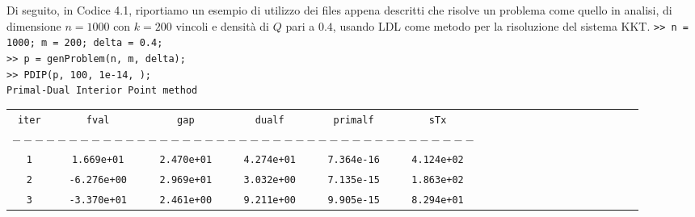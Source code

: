 Di seguito, in Codice 4.1, riportiamo un esempio di utilizzo dei files appena descritti che risolve un problema come quello in analisi, di dimensione $n=1000$ con $k=200$ vincoli e densità di $Q$ pari a $0.4$, usando LDL come metodo per la risoluzione del sistema KKT.
\newpage
\noindent
\texttt{>> n = 1000; m = 200; delta = 0.4;}\\
\texttt{>> p = genProblem(n, m, delta);}\\
\texttt{>> PDIP(p, 100, 1e-14, );}\\
\noindent
\texttt{Primal-Dual Interior Point method}
\begin{table}[!h]
\begin{tabular}{ccccccllllllllllllll}
\texttt{iter}                                              & \texttt{fval}                                                                  & \texttt{gap}                                                                   & \texttt{dualf}                                                                 & \texttt{primalf}              & \texttt{sTx}                  &  &  &  &  &  &  &  &  &  &  &  &  &  &  \\
\multicolumn{6}{l}{$-----------------------------------------$}                                                                                                                                                                                                                                                                                                         &  &  &  &  &  &  &  &  &  &  &  &  &  &  \\
\texttt{1}                                                 & \texttt{1.669e+01}                                                             & \texttt{2.470e+01}                                                             & \texttt{4.274e+01}                                                             & \texttt{7.364e-16}            & \texttt{4.124e+02}            &  &  &  &  &  &  &  &  &  &  &  &  &  &  \\
\texttt{2}                                                 & \texttt{-6.276e+00}                                                            & \texttt{2.969e+01}                                                             & \texttt{3.032e+00}                                                             & \texttt{7.135e-15}            & \texttt{1.863e+02}            &  &  &  &  &  &  &  &  &  &  &  &  &  &  \\
\texttt{3}                                                 & \texttt{-3.370e+01}                                                            & \texttt{2.461e+00}                                                             & \texttt{9.211e+00}                                                             & \texttt{9.905e-15}            & \texttt{8.294e+01}            &  &  &  &  &  &  &  &  &  &  &  &  &  &  \\

\end{tabular}
\end{table}
